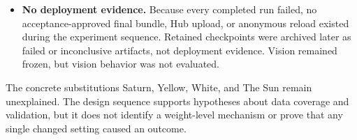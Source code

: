 \begin{itemize}
  three boundaries. The paper identifies GPT-2 XL as the single-edit model and,
  in a separate statement, says all reported results except \texttt{FT (21st
  layer)} use LoRA; released \texttt{run.py} instead performs full-parameter
  AdamW; and Qwen language-only LoRA was this project's adaptation.
  \citep{gangadhar2024model,gangadhar2024code}
  \item \textbf{No deployment evidence.} Because every completed run failed,
  no acceptance-approved final bundle, Hub upload, or anonymous reload existed
  during the experiment sequence. Retained checkpoints were archived later as
  failed or inconclusive artifacts, not deployment evidence. Vision remained
  frozen, but vision behavior was not evaluated.
\end{itemize}

The concrete substitutions Saturn, Yellow, White, and The Sun remain unexplained.
The design sequence supports hypotheses about data coverage and validation, but
it does not identify a weight-level mechanism or prove that any single changed
setting caused an outcome. 
